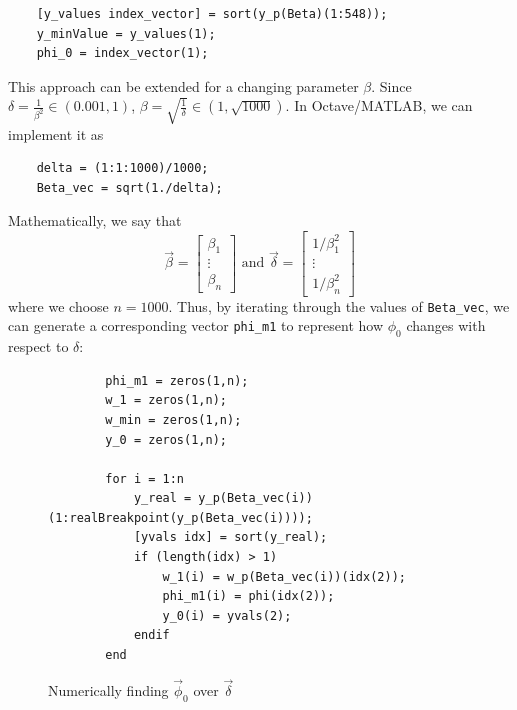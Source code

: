 \begin{verbatim}
    [y_values index_vector] = sort(y_p(Beta)(1:548));
    y_minValue = y_values(1);
    phi_0 = index_vector(1);
\end{verbatim}

This approach can be extended for a changing parameter $\beta$. 
Since $\delta=\frac{1}{\beta^2}\in (0.001,1)$, $\beta=\sqrt{\frac{1}{\delta}}\in (1,\sqrt{1000})$.
In Octave/MATLAB, we can implement it as

\begin{verbatim}
    delta = (1:1:1000)/1000;
    Beta_vec = sqrt(1./delta);
\end{verbatim}

Mathematically, we say that 
\begin{equation}
\vec\beta=\begin{bmatrix}\beta_1\\\vdots\\\beta_n\end{bmatrix}\text{ and }\vec{\delta}=\begin{bmatrix}1/\beta_1^2\\\vdots\\1/\beta_n^2\end{bmatrix}
\label{paravectors}
\end{equation}
where we choose $n=1000$.
Thus, by iterating through the values of \verb|Beta_vec|, we can generate a corresponding vector \verb|phi_m1| to represent how $\phi_0$ changes with respect to $\delta$:

\begin{figure}[H]
    \begin{verbatim}
        phi_m1 = zeros(1,n);
        w_1 = zeros(1,n);
        w_min = zeros(1,n);
        y_0 = zeros(1,n);
    
        for i = 1:n
            y_real = y_p(Beta_vec(i))(1:realBreakpoint(y_p(Beta_vec(i))));
            [yvals idx] = sort(y_real);
            if (length(idx) > 1)
                w_1(i) = w_p(Beta_vec(i))(idx(2));
                phi_m1(i) = phi(idx(2));
                y_0(i) = yvals(2);
            endif
        end
    \end{verbatim}
    \caption{Numerically finding $\vec\phi_0$ over $\vec{\delta}$}\label{loop1}
\end{figure}

